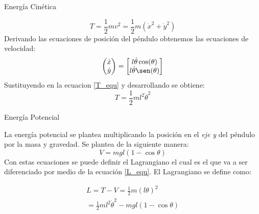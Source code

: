 \begin{flushleft}
{\large Energía Cinética}
\end{flushleft}
\begin{equation} \label{T_equ}
T = \frac{1}{2}mv^2 = \frac{1}{2}m(\dot{x}^2 + \dot{y}^2) 
\end{equation}
Derivando las ecuaciones de posición del péndulo obtenemos las ecuaciones de velocidad:
\begin{equation}
\left(\begin{matrix}
\dot{x}\\
\dot{y}
\end{matrix}\right) = 
\begin{bmatrix}
l\dot{\theta}\cos(\theta)\\
l\dot{\theta}\sen(\theta)
\end{bmatrix}
\end{equation}
Sustituyendo en la ecuacion \ref{T_equ} y desarrollando se obtiene:
\begin{equation}
T = \frac{1}{2}ml^2\dot{\theta}^2
\end{equation}
\begin{flushleft}
{\large Energía Potencial}
\end{flushleft}
La energía potencial se plantea multiplicando la posición en el \emph{eje y} del péndulo por la masa y gravedad. Se plantea de la siguiente manera:
\begin{equation} \label{V_equ}
V = mgl(1-\cos \theta)
\end{equation}
Con estas ecuaciones se puede definir el Lagrangiano el cual es el que va a ser diferenciado por medio de la ecuación \ref{L_equ}. El Lagrangiano se define como:

\begin{large}
\begin{align*}
L = T - V = \frac{1}{2}m(l\theta)^2 \\
= \frac{1}{2}ml^2\dot{\theta}^2 - mgl(1-\cos \theta)
\end{align*}
\end{large}

